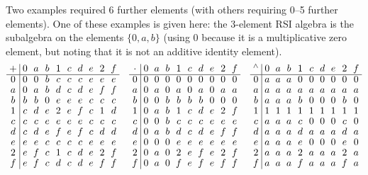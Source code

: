 \documentclass[eqnor,reqno]{amsart}
\theoremstyle{plain}
\theoremstyle{definition}
\begin{document}
Two examples required 6 further elements (with others requiring 0--5 further elements).
One of these examples is given here: the 3-element RSI algebra is the subalgebra on the elements $\{0,a,b\}$ (using $0$ because it is a multiplicative zero element, but noting that it is not an additive identity element).
\[\setlength{\arraycolsep}{3pt}
\renewcommand{\arraystretch}{0.9}
\begin{array}{c|ccccccccc}
+ & 0 & a & b & 1 & c & d & e & 2 & f\\
\hline
0 & 0 & 0 & b & c & c & c & e & e & e\\
a & 0 & a & b & d & c & d & e & f & f\\
b & b & b & 0 & e & e & e & c & c & c\\
1 & c & d & e & 2 & e & f & c & 1 & d\\
c & c & c & e & e & e & e & c & c & c\\
d & c & d & e & f & e & f & c & d & d\\
e & e & e & c & c & c & c & e & e & e\\
2 & e & f & c & 1 & c & d & e & 2 & f\\
f & e & f & c & d & c & d & e & f & f
\end{array}\quad
\begin{array}{c|ccccccccc}
\cdot & 0 & a & b & 1 & c & d & e & 2 & f\\
\hline
0 & 0 & 0 & 0 & 0 & 0 & 0 & 0 & 0 & 0\\
a & 0 & a & 0 & a & 0 & a & 0 & a & a\\
b & 0 & 0 & b & b & b & b & 0 & 0 & 0\\
1 & 0 & a & b & 1 & c & d & e & 2 & f\\
c & 0 & 0 & b & c & c & c & e & e & e\\
d & 0 & a & b & d & c & d & e & f & f\\
e & 0 & 0 & 0 & e & e & e & e & e & e\\
2 & 0 & a & 0 & 2 & e & f & e & 2 & f\\
f & 0 & a & 0 & f & e & f & e & f & f
\end{array}\quad
\begin{array}{c|ccccccccc}
{}^\wedge & 0 & a & b & 1 & c & d & e & 2 & f\\
\hline
0 & a & a & a & 0 & 0 & 0 & 0 & 0 & 0\\
a & a & a & a & a & a & a & a & a & a\\
b & a & a & a & b & 0 & 0 & 0 & b & 0\\
1 & 1 & 1 & 1 & 1 & 1 & 1 & 1 & 1 & 1\\
c & a & a & a & c & 0 & 0 & 0 & c & 0\\
d & a & a & a & d & a & a & a & d & a\\
e & a & a & a & e & 0 & 0 & 0 & e & 0\\
2 & a & a & a & 2 & a & a & a & 2 & a\\
f & a & a & a & f & a & a & a & f & a
\end{array}
\]
\end{document}
